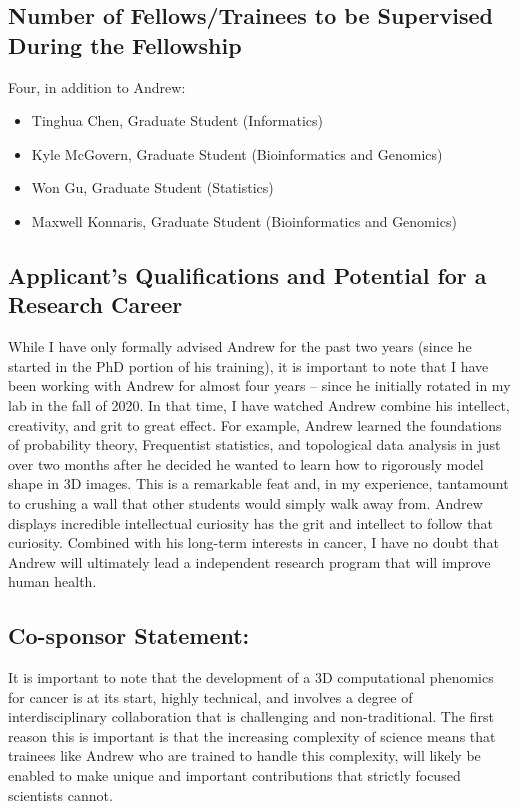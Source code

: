 \documentclass{NIHGrant}
\begin{document}
\subsection*{Number of Fellows/Trainees to be Supervised During the Fellowship}

Four, in addition to Andrew: 

\begin{itemize}
\item Tinghua Chen, Graduate Student (Informatics)
\item Kyle McGovern, Graduate Student (Bioinformatics and Genomics)
\item Won Gu, Graduate Student (Statistics)
\item Maxwell Konnaris, Graduate Student (Bioinformatics and Genomics)
\end{itemize}

\subsection*{Applicant's Qualifications and Potential for a Research Career}

While I have only formally advised Andrew for the past two years (since he
started in the PhD portion of his training), it is important to note that I have
been working with Andrew for almost four years -- since he initially rotated in
my lab in the fall of 2020. In that time, I have watched Andrew combine his
intellect, creativity, and grit to great effect. For example, Andrew learned the
foundations of probability theory, Frequentist statistics, and topological data
analysis in just over two months after he decided he wanted to learn how to
rigorously model shape in 3D images. This is a remarkable feat and, in my
experience, tantamount to crushing a wall that other students would simply walk
away from. Andrew displays incredible intellectual curiosity has the grit and
intellect to follow that curiosity. Combined with his long-term interests in
cancer, I have no doubt that Andrew will ultimately lead a independent research
program that will improve human health.

\subsection*{Co-sponsor Statement: }
It is important to note that the development of a 3D computational phenomics for cancer is at its start, highly technical, and involves a degree of interdisciplinary collaboration that is challenging and non-traditional. The first reason this is important is that the increasing complexity of science means that trainees like Andrew who are trained to handle this complexity, will likely be enabled to make unique and important contributions that strictly focused scientists cannot.
\end{document}
